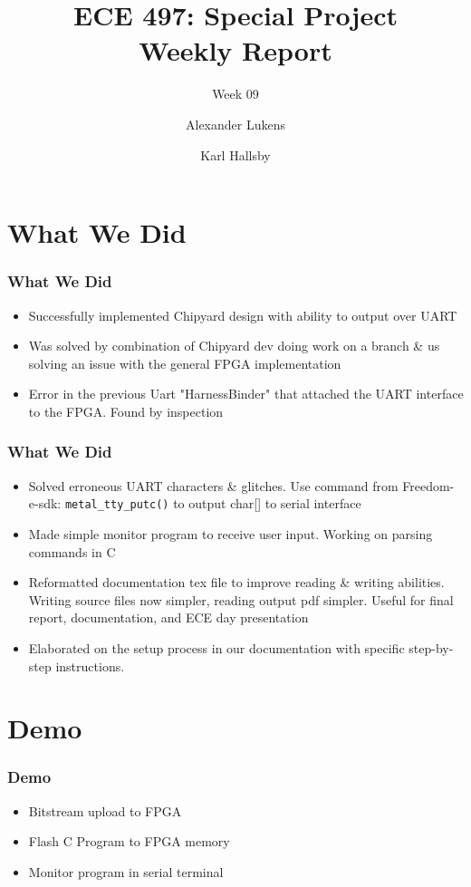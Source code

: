\documentclass{../weeklyslides}
\title[Weekly Report]{ECE 497: Special Project \\ Weekly Report}
\subtitle{Week 09}
\author{Alexander Lukens \and Karl Hallsby}
\institute{Illinois Institute of Technology}
\date{\DTMdisplaydate{2021}{3}{25}{-1}}
\begin{document}
\nocite{chipyard}

\begin{frame}
  \titlepage{}
\end{frame}

\section{What We Did}
\begin{frame}
  \frametitle{What We Did}
  \begin{itemize}
	\item Successfully implemented Chipyard design with ability to output over UART
	\item Was solved by combination of Chipyard dev doing work on a branch \& us solving an issue with the general FPGA implementation
	\item Error in the previous Uart "HarnessBinder" that attached the UART interface to the FPGA. Found by inspection
  \end{itemize}
\end{frame}

\begin{frame}
	\frametitle{What We Did}
  \begin{itemize}
	\item Solved erroneous UART characters \& glitches. Use command from Freedom-e-sdk: \texttt{metal_tty_putc()} to output char[] to serial interface
	
	\item Made simple monitor program to receive user input. Working on parsing commands in C
	
	\item Reformatted documentation tex file to improve reading \& writing abilities. Writing source files now simpler, reading output pdf simpler. Useful for final report, documentation, and ECE day presentation
	
	\item Elaborated on the setup process in our documentation with specific step-by-step instructions.
  \end{itemize}
\end{frame}
\section{Demo}\label{sec:Demo}
\begin{frame}
	\frametitle{Demo}
	\begin{itemize}
		\item Bitstream upload to FPGA
		\item Flash C Program to FPGA memory
		\item Monitor program in serial terminal
	\end{itemize}
	
\end{frame}
\end{document}
